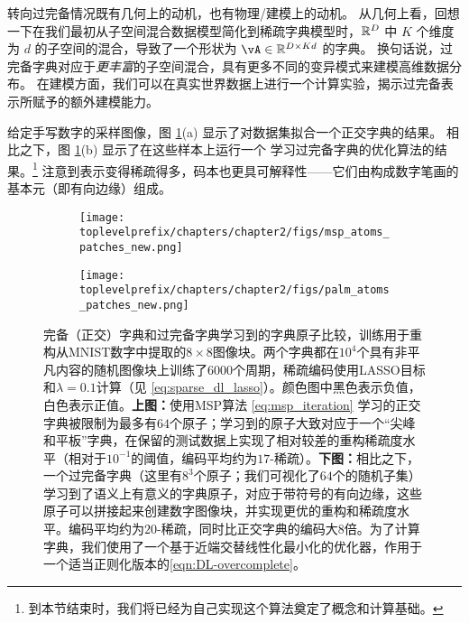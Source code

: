\documentclass[../../book-main_zh.tex]{subfiles}
\begin{document}
转向过完备情况既有几何上的动机，也有物理/建模上的动机。
从几何上看，回想一下在我们最初从子空间混合数据模型简化到稀疏字典模型时，$\mathbb{R}^D$ 中 $K$ 个维度为 $d$ 的子空间的混合，导致了一个形状为 $\vA \in \R^{D \times Kd}$ 的字典。
换句话说，过完备字典对应于\textit{更丰富}的子空间混合，具有更多不同的变异模式来建模高维数据分布。
在建模方面，我们可以在真实世界数据上进行一个计算实验，揭示过完备表示所赋予的额外建模能力。
\begin{example}
给定手写数字的采样图像，图 \ref{fig:ReconMNIST}(a) 显示了对数据集拟合一个正交字典的结果。
相比之下，图 \ref{fig:ReconMNIST}(b) 显示了在这些样本上运行一个
学习过完备字典的优化算法的结果。\footnote{到本节结束时，我们将已经为自己实现这个算法奠定了概念和计算基础。}
注意到表示变得稀疏得多，码本也更具可解释性——它们由构成数字笔画的基本元（即有向边缘）组成。
\end{example}

\begin{figure}[t]
\centering
    \begin{subfigure}{0.9\linewidth}
        \centering
        \texttt{[image: \\toplevelprefix/chapters/chapter2/figs/msp\_atoms\_patches\_new.png]}
        \caption{}
    \end{subfigure}
    \begin{subfigure}{0.9\linewidth}
        \centering
        \texttt{[image: \\toplevelprefix/chapters/chapter2/figs/palm\_atoms\_patches\_new.png]}
        \caption{}
    \end{subfigure}
    \caption{完备（正交）字典和过完备字典学习到的字典原子比较，训练用于重构从MNIST数字中提取的$8 \times 8$图像块。两个字典都在$10^4$个具有非平凡内容的随机图像块上训练了$6000$个周期，稀疏编码使用LASSO目标和$\lambda=0.1$计算（见 \eqref{eq:sparse_dl_lasso}）。颜色图中黑色表示负值，白色表示正值。\textbf{上图：}使用MSP算法 \eqref{eq:msp_iteration} 学习的正交字典被限制为最多有$64$个原子；学习到的原子大致对应于一个“尖峰和平板”字典，在保留的测试数据上实现了相对较差的重构稀疏度水平（相对于$10^{-1}$的阈值，编码平均约为$17$-稀疏）。\textbf{下图：}相比之下，一个过完备字典（这里有$8^3$个原子；我们可视化了$64$个的随机子集）学习到了语义上有意义的字典原子，对应于带符号的有向边缘，这些原子可以拼接起来创建数字图像块，并实现更优的重构和稀疏度水平。编码平均约为$20$-稀疏，同时比正交字典的编码大$8$倍。为了计算字典，我们使用了一个基于近端交替线性化最小化的优化器，作用于一个适当正则化版本的\eqref{eqn:DL-overcomplete}。}
    \label{fig:ReconMNIST}
\end{figure}
\end{document}
